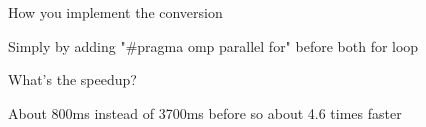 \documentclass{article}
\begin{document}
How you implement the conversion

Simply by adding "#pragma omp parallel for" before both for loop



	
What’s the speedup?

About 800ms instead of 3700ms before so about 4.6 times faster
\end{document}
